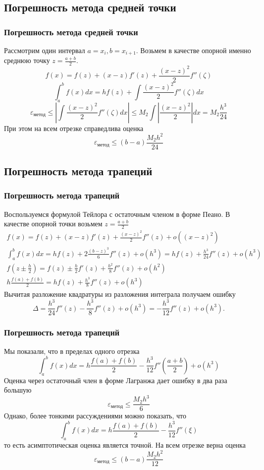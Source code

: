 \documentclass[apectratio=43,unicode]{beamer}
\begin{document}
\subsection{Погрешность метода средней точки}
\begin{frame}
\frametitle{Погрешность метода средней точки}
	Рассмотрим один интервал $a=x_i, b=x_{i+1}$.
	Возьмем в качестве опорной именно среднюю точку $z = \frac{a+b}{2}$.
	\[
	f(x) = f(z) + (x-z)f'(z) + \frac{(x-z)^2}{2}f''(\zeta)
	\]
	\[
	\int_a^b f(x) dx = h f(z) + \int \frac{(x-z)^2}{2}f''(\zeta) dx
	\]
	\[
	\varepsilon_{\text{метод}} \leq \left|\int \frac{(x-z)^2}{2}f''(\zeta) dx \right|
	\leq M_2 \int \left|\frac{(x-z)^2}{2}\right| dx  = M_2 \frac{h^3}{24}
	\]
	При этом на всем отрезке справедлива оценка
	\[
	\varepsilon_{\text{метод}} \leq (b-a) \frac{M_2h^2}{24}
	\]
\end{frame}

\subsection{Погрешность метода трапеций}
\begin{frame}
\frametitle{Погрешность метода трапеций}
	Воспользуемся формулой Тейлора с остаточным членом в форме Пеано. В качестве опорной точки возьмем $z = \frac{a+b}{2}$
	\begin{gather*}
	f(x) = f(z) + (x-z)f'(z) + \frac{(x-z)^2}{2}f''(z) + o((x-z)^2)\\
	\int_a^b f(x) dx = h f(z) + 2\frac{(b-z)^3}{6}f''(z) + o(h^3) = hf(z) +
\frac{h^3}{24}f''(z) + o(h^3)\\
	f\left(z \pm \frac{h}{2}\right) = f(z) \pm \frac{h}{2} f'(z) + \frac{h^2}{8}
f''(z) + o(h^2)\\
	h\frac{f(a)+f(b)}{2} = hf(z) + \frac{h^3}{8} f''(z) + o(h^3)
	\end{gather*}
	Вычитая разложение квадратуры из разложения интеграла получаем ошибку
	\[
	\Delta = \frac{h^3}{24}f''(z) - \frac{h^3}{8}f''(z) + o(h^3) = -\frac{h^3}{12}f''(z) + o(h^3).
	\]
\end{frame}

\begin{frame}
\frametitle{Погрешность метода трапеций}
	Мы показали, что в пределах одного отрезка
	\[
	\int_a^b f(x) dx = h\frac{f(a)+f(b)}{2} - \frac{h^3}{12}f''\left(\frac{a+b}{2}\right) + o(h^3)
	\]
	Оценка через остаточный член в форме Лагранжа дает ошибку в два раза большую
	\[
	\varepsilon_{\text{метод}} \leq \frac{M_2 h^3}{6}
	\]
	Однако, более тонкими рассуждениями можно показать, что
	\[
	\int_a^b f(x) dx = h\frac{f(a)+f(b)}{2} - \frac{h^3}{12}f''(\xi)
	\]
	то есть асимптотическая оценка является точной.  На всем отрезке верна оценка
	\[
	\varepsilon_{\text{метод}} \leq (b-a) \frac{M_2 h^2}{12}
	\]
\end{frame}
\end{document}
